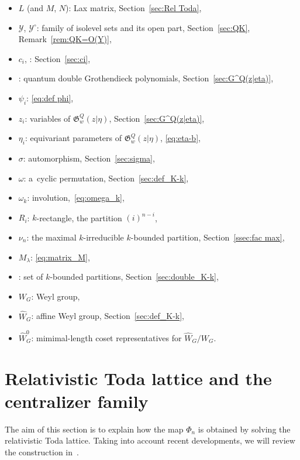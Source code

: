 \documentclass[pdftex]{sigma}
\numberwithin{equation}{section}
\newcommand{\la}{\lambda}
\newcommand{\fac}{\psi}
\theoremstyle{definition}
\begin{document}
\begin{itemize}[itemsep=0pt]
 \item $L$ (and $M$, $N$): Lax matrix, Section~\ref{sec:Rel Toda},
 \item $\mathscr{Y}$, $\mathscr{Y}^\circ$: family of isolevel sets and its open part, Section~\ref{sec:QK}, Remark~\ref{rem:QK=O(Y)},
 \item $c_i$, : Section~\ref{sec:ci},
 \item {}: quantum double Grothendieck polynomials, Section~\ref{sec:G^Q(z|eta)},
 \item $\fac_i$: \eqref{eq:def phi},
 \item $z_i$: variables of $\mathfrak{G}_w^Q(z| \eta)$, Section~\ref{sec:G^Q(z|eta)},
 \item $\eta_i$: equivariant parameters of $\mathfrak{G}_w^Q(z| \eta)$, \eqref{eq:eta-b},
 \item $\sigma$: automorphism, Section~\ref{sec:sigma},
 \item $\omega$: a~cyclic permutation, Section~\ref{sec:def_K-k},
 \item $\omega_k$: involution,~\eqref{eq:omega_k},
 \item $R_i$: $k$-rectangle, the partition $(i)^{n-i}$,
 \item $\nu_n$: the maximal $k$-irreducible $k$-bounded partition, Section~\ref{ssec:fac max},
 \item $M_\la$: \eqref{eq:matrix_M},
 \item {}: set of $k$-bounded partitions, Section~\ref{sec:double_K-k},
 \item $W_G$: Weyl group,
 \item $\hat{W}_G$: affine Weyl group, Section~\ref{sec:def_K-k},
 \item $\hat{W}_G^0$: mimimal-length coset representatives for $\hat{W}_G/W_G$.
\end{itemize}

\section{Relativistic Toda lattice and the centralizer family}\label{sec:RTL}
The aim of this section is to explain how the map $\Phi_n$ is
obtained by solving the relativistic Toda lattice.
Taking into account
recent developments,
we will review the construction in~\cite{IIM}.
\end{document}
